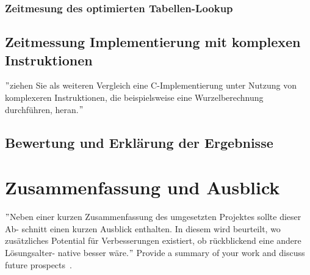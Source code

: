 \documentclass[course=erap]{aspdoc}
\begin{document}
\subsubsection{Zeitmesung des optimierten Tabellen-Lookup}

\subsection{Zeitmessung Implementierung mit komplexen Instruktionen}
\("\)ziehen Sie als weiteren Vergleich eine C-Implementierung unter Nutzung von komplexeren Instruktionen, die beispielsweise eine Wurzelberechnung durchführen, heran.\("\)

\subsection{Bewertung und Erklärung der Ergebnisse}



\section{Zusammenfassung und Ausblick}
\("\)Neben einer kurzen Zusammenfassung des umgesetzten Projektes sollte dieser Ab- schnitt einen kurzen Ausblick enthalten. In diesem wird beurteilt, wo zusätzliches Potential für Verbesserungen existiert, ob rückblickend eine andere Lösungsalter- native besser wäre.\("\)
Provide a summary of your work and discuss future prospects~\cite{intel2017man}.




{}
\end{document}
